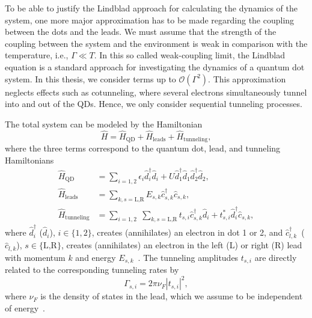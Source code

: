 \documentclass[../main.tex]{subfiles}
\begin{document}
To be able to justify the Lindblad approach for calculating the dynamics of the system, one more major approximation has to be made regarding the coupling between the dots and the leads. We must assume that the strength of the coupling between the system and the environment is weak in comparison with the temperature, i.e., $\Gamma \ll T$. In this so called weak-coupling limit, the Lindblad equation is a standard approach for investigating the dynamics of a quantum dot system. In this thesis, we consider terms up to $\mathcal{O}(\Gamma^2)$. This approximation neglects effects such as cotunneling, where several electrons simultaneously tunnel into and out of the QDs. Hence, we only consider sequential tunneling processes.

The total system can be modeled by the Hamiltonian
\begin{equation}
    \hat H = \hat H_\text{QD} + \hat H_\text{leads} + \hat H_\text{tunneling},
\end{equation}
where the three terms correspond to the quantum dot, lead, and tunneling Hamiltonians
\begin{equation}
    \begin{split}
        \hat H_\text{QD} &= \sum_{i=1,2} \epsilon_i \hat d_i^\dag \hat d_i  + U\hat d_1^\dag \hat d_1 \hat d_2^\dag \hat d_2, \\
        \hat H_\text{leads} &= \sum_{k,s=\text{L,R}} E_{s, k} \hat c_{s,k}^\dag \hat c_{s,k}, \\
        \hat H_\text{tunneling} &= \sum_{i=1,2} \; \sum_{k,s=\text{L,R}} t_{s,i} \hat c_{s,k}^\dag \hat d_i + t_{s,i}^* \hat d_i^\dag \hat c_{s,k},
    \end{split}
\end{equation}
where $\hat d_i^\dag$ ($\hat d_i$), $i\in\{1,2\}$, creates (annihilates) an electron in dot 1 or 2, and $\hat c_{l,k}^\dag$~($\hat c_{l,k}$), $s\in\{\text{L,R}\}$, creates (annihilates) an electron in the left (L) or right (R) lead with momentum $k$ and energy $E_{s,k}$~\cite{doubledot}. The tunneling amplitudes $t_{s,i}$ are directly related to the corresponding tunneling rates by 
\begin{equation}
    \Gamma_{s,i} = 2\pi\nu_F|t_{s,i}|^2,
\end{equation}
where $\nu_F$ is the density of states in the lead, which we assume to be independent of energy~\cite{perlind}.
\end{document}
